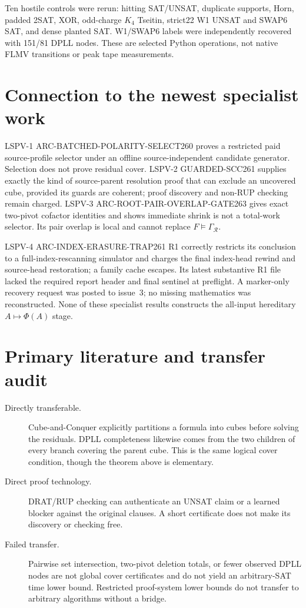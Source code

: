 \documentclass[11pt]{article}
\begin{document}
Ten hostile controls were rerun: hitting SAT/UNSAT, duplicate supports, Horn,
padded 2SAT, XOR, odd-charge $K_4$ Tseitin, strict22 W1 UNSAT and SWAP6 SAT,
and dense planted SAT.  W1/SWAP6 labels were independently recovered with
151/81 DPLL nodes.  These are selected Python operations, not native FLMV
transitions or peak tape measurements.

\section{Connection to the newest specialist work}
LSPV-1 ARC-BATCHED-POLARITY-SELECT260 proves a restricted paid source-profile
selector under an offline source-independent candidate generator.  Selection
does not prove residual cover.  LSPV-2 GUARDED-SCC261 supplies exactly the kind
of source-parent resolution proof that can exclude an uncovered cube, provided
its guards are coherent; proof discovery and non-RUP checking remain charged.
LSPV-3 ARC-ROOT-PAIR-OVERLAP-GATE263 gives exact two-pivot cofactor identities
and shows immediate shrink is not a total-work selector.  Its pair overlap is
local and cannot replace $F\models\Gamma_{\mathcal R}$.

LSPV-4 ARC-INDEX-ERASURE-TRAP261 R1 correctly restricts its conclusion to a
full-index-rescanning simulator and charges the final index-head rewind and
source-head restoration; a family cache escapes.  Its latest substantive R1
file lacked the required report header and final sentinel at preflight.  A
marker-only recovery request was posted to issue~3; no missing mathematics was
reconstructed.  None of these specialist results constructs the all-input
hereditary $A\mapsto\Phi(A)$ stage.

\section{Primary literature and transfer audit}
\begin{description}
\item[Directly transferable.] Cube-and-Conquer explicitly partitions a formula
into cubes before solving the residuals.  DPLL completeness likewise comes from
the two children of every branch covering the parent cube.  This is the same
logical cover condition, though the theorem above is elementary.
\item[Direct proof technology.] DRAT/RUP checking can authenticate an UNSAT
claim or a learned blocker against the original clauses.  A short certificate
does not make its discovery or checking free.
\item[Failed transfer.] Pairwise set intersection, two-pivot deletion totals,
or fewer observed DPLL nodes are not global cover certificates and do not yield
an arbitrary-SAT time lower bound.  Restricted proof-system lower bounds do not
transfer to arbitrary algorithms without a bridge.
\end{description}
\end{document}
